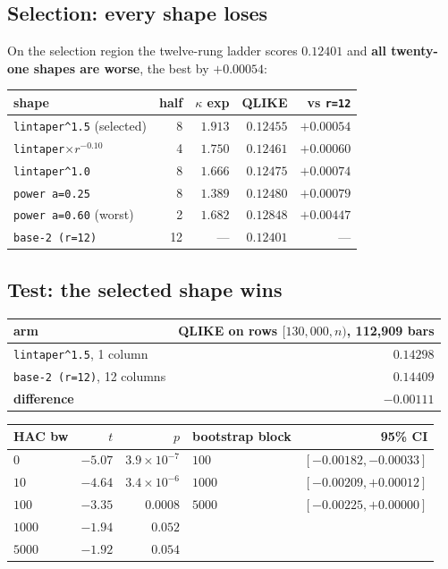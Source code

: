 \documentclass[11pt,a4paper]{article}
\begin{document}
\subsection{Selection: every shape loses}

On the selection region the twelve-rung ladder scores $0.12401$ and
\textbf{all twenty-one shapes are worse}, the best by $+0.00054$:

\begin{table}[h]
\centering
\begin{tabular}{lrrrr}
\toprule
shape & half & $\kappa$ exp & QLIKE & vs \texttt{r=12} \\
\midrule
\texttt{lintaper\^{}1.5} (selected) & 8 & $1.913$ & $0.12455$ & $+0.00054$ \\
\texttt{lintaper}$\times r^{-0.10}$ & 4 & $1.750$ & $0.12461$ & $+0.00060$ \\
\texttt{lintaper\^{}1.0}            & 8 & $1.666$ & $0.12475$ & $+0.00074$ \\
\texttt{power a=0.25}               & 8 & $1.389$ & $0.12480$ & $+0.00079$ \\
\midrule
\texttt{power a=0.60} (worst)       & 2 & $1.682$ & $0.12848$ & $+0.00447$ \\
\texttt{base-2 (r=12)}              & 12 & ---    & $0.12401$ & --- \\
\bottomrule
\end{tabular}
\end{table}

\subsection{Test: the selected shape wins}

\begin{table}[h]
\centering
\begin{tabular}{lr}
\toprule
arm & QLIKE on rows $[130{,}000, n)$, 112{,}909 bars \\
\midrule
\texttt{lintaper\^{}1.5}, 1 column & $0.14298$ \\
\texttt{base-2 (r=12)}, 12 columns & $0.14409$ \\
\textbf{difference} & $\mathbf{-0.00111}$ \\
\bottomrule
\end{tabular}
\end{table}

\begin{table}[h]
\centering
\begin{tabular}{lrrlr}
\toprule
HAC bw & $t$ & $p$ & bootstrap block & 95\% CI \\
\midrule
$0$    & $-5.07$ & $3.9\!\times\!10^{-7}$ & $100$  & $[-0.00182, -0.00033]$ \\
$10$   & $-4.64$ & $3.4\!\times\!10^{-6}$ & $1000$ & $[-0.00209, +0.00012]$ \\
$100$  & $-3.35$ & $0.0008$               & $5000$ & $[-0.00225, +0.00000]$ \\
$1000$ & $-1.94$ & $0.052$ & & \\
$5000$ & $-1.92$ & $0.054$ & & \\
\bottomrule
\end{tabular}
\end{table}
\end{document}
